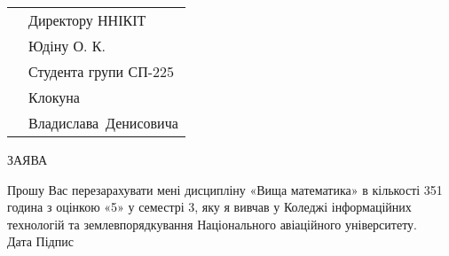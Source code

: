 \documentclass[a4paper,oneside,DIV=9,12pt]{scrartcl}
\begin{document}
	\pagestyle{empty}
%		
	
	\begin{tabular}{p{228pt}l}
		& Директору ННІКІТ\\
		& Юдіну О. К.\\
		& Студента групи СП-225\\
		& Клокуна\\
		& Владислава~Денисовича\\
	\end{tabular}
	
	\begin{center}
	ЗАЯВА
	\end{center}
	
	Прошу Вас перезарахувати мені дисципліну «Вища математика» в кількості 351 година з оцінкою «5» у семестрі 3, яку я вивчав у Коледжі інформаційних технологій та землевпорядкування Національного авіаційного університету.\\[1cm]
	
	\noindent Дата \hspace{\fill} Підпис
	
\end{document}
